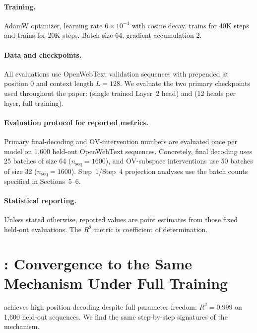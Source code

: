 \documentclass{article}
\theoremstyle{plain}
\theoremstyle{definition}
\theoremstyle{remark}
\begin{document}
\paragraph{Training.}
AdamW optimizer, learning rate $6\times10^{-4}$ with cosine decay.
\modelminimal trains for 40K steps and \modelfull trains for 20K steps.
Batch size 64, gradient accumulation 2.

\paragraph{Data and checkpoints.}
All evaluations use OpenWebText validation sequences with \bos prepended at position 0 and context length $L=128$.
We evaluate the two primary checkpoints used throughout the paper:
\modelminimal (single trained Layer~2 head) and \modelfull (12 heads per layer, full training).

\paragraph{Evaluation protocol for reported metrics.}
Primary final-decoding and OV-intervention numbers are evaluated once per model on 1,600 held-out OpenWebText sequences.
Concretely, final decoding uses 25 batches of size 64 ($n_{\text{seq}}=1600$), and OV-subspace interventions use
50 batches of size 32 ($n_{\text{seq}}=1600$).
Step~1/Step~4 projection analyses use the batch counts specified in Sections~5--6.

\paragraph{Statistical reporting.}
Unless stated otherwise, reported values are point estimates from those fixed held-out evaluations.
The $R^2$ metric is coefficient of determination.


\section{\modelfull: Convergence to the Same Mechanism Under Full Training}
\label{app:full_evidence_app}

\modelfull achieves high position decoding despite full parameter freedom:
$R^2=0.999$ on 1,600 held-out sequences.
We find the same step-by-step signatures of the mechanism.
\end{document}
